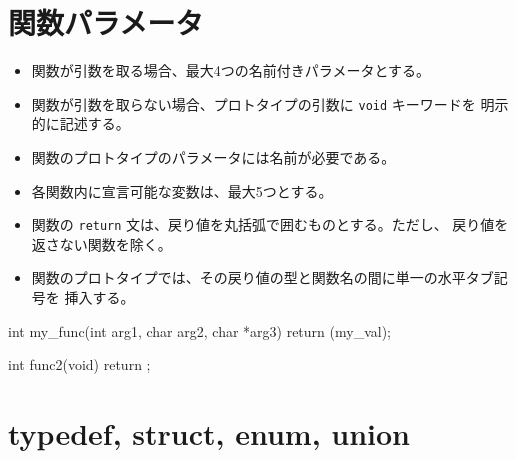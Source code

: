 \documentclass{42-ja}
\begin{document}
    \section{関数パラメータ}

        \begin{itemize}

            \item 関数が引数を取る場合、最大4つの名前付きパラメータとする。

            \item 関数が引数を取らない場合、プロトタイプの引数に \texttt{void} キーワードを
              明示的に記述する。

            \item 関数のプロトタイプのパラメータには名前が必要である。

            \item 各関数内に宣言可能な変数は、最大5つとする。

            \item 関数の \texttt{return} 文は、戻り値を丸括弧で囲むものとする。ただし、
              戻り値を返さない関数を除く。

            \item 関数のプロトタイプでは、その戻り値の型と関数名の間に単一の水平タブ記号を
              挿入する。

        \end{itemize}

\vspace{1cm}

            \begin{42ccode}
int my_func(int arg1, char arg2, char *arg3)
{
    return (my_val);
}

int func2(void)
{
    return ;
}
            \end{42ccode}

        \newpage


\section{typedef, struct, enum, union}
\end{document}
